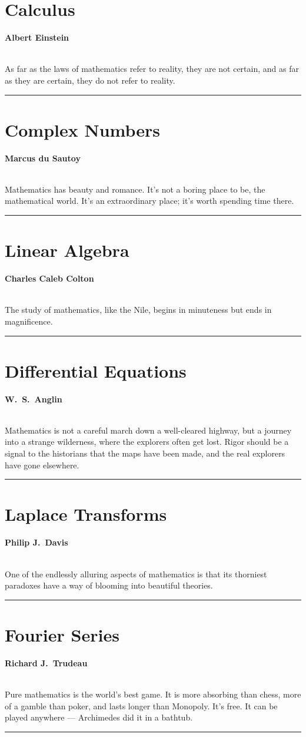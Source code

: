 \documentclass[a5paper,9pt]{book}
\theoremstyle{definition}
\newcommand{\qq}[2]{%
    \begin{center}

        \begin{minipage}{0.75\textwidth}

          \hrulefill\hspace{2.5mm}\textbf{#2}\hspace{2.5mm}\hrulefill\medskip

          \hspace*{\fill}{\Large\textbf{``}}\hspace*{\fill} \\
          #1 \\[\baselineskip]
          \hspace*{\fill}{\Large\textbf{''}}\hspace*{\fill}

          \smallskip\hrule

        \end{minipage}

    \end{center}
}
\begin{document}
    \chapter{Calculus}%
        \label{chap:calculus}
        \qq{As far as the laws of mathematics refer to reality, they are not certain, and as far as they are certain, they do not refer to reality.}{Albert Einstein}
        \newpage

    \chapter{Complex Numbers}%
        \label{chap:complex_numbers}
        \qq{Mathematics has beauty and romance. It’s not a boring place to be, the mathematical world. It’s an extraordinary place; it’s worth spending time there.}
        {Marcus du Sautoy}
        \newpage

    \chapter{Linear Algebra}%
        \label{chap:linear_algebra}
        \qq{The study of mathematics, like the Nile, begins in minuteness but ends in magnificence.}
        {Charles Caleb Colton}
        \newpage

    \chapter{Differential Equations}%
        \label{chap:differential_equations}
        \qq{Mathematics is not a careful march down a well-cleared highway, but a journey into a strange wilderness, where the explorers often get lost. Rigor should be a signal to the historians that the maps have been made, and the real explorers have gone elsewhere.}
        {W.\ S.\ Anglin}
        \newpage

    \chapter{Laplace Transforms}%
        \label{chap:laplace_transforms}
        \qq{One of the endlessly alluring aspects of mathematics is that its thorniest paradoxes have a way of blooming into beautiful theories.}
        {Philip J.\ Davis}
        \newpage

    \chapter{Fourier Series}%
        \label{chap:fourier_series}
        \qq{Pure mathematics is the world’s best game. It is more absorbing than chess, more of a gamble than poker, and lasts longer than Monopoly. It’s free. It can be played anywhere --- Archimedes did it in a bathtub.}
        {Richard J.\ Trudeau}
        \newpage
\end{document}
